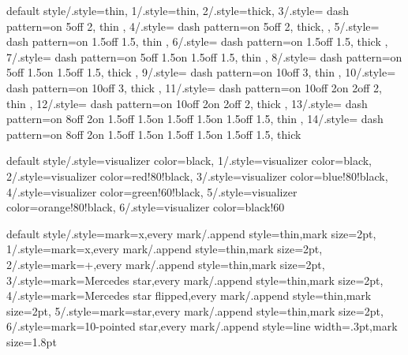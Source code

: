 {
  default style/.style=thin,
  1/.style=thin,
  2/.style=thick,
  3/.style={
    dash pattern=on 5\pgflinewidth off 2\pgflinewidth,
    thin
  },
  4/.style={
    dash pattern=on 5\pgflinewidth off 2\pgflinewidth,
    thick,
  },
  5/.style={
    dash pattern=on 1.5\pgflinewidth off 1.5\pgflinewidth,
    thin
  },
  6/.style={
    dash pattern=on 1.5\pgflinewidth off 1.5\pgflinewidth,
    thick
  },
  7/.style={
    dash pattern=on 5\pgflinewidth off 1.5\pgflinewidth on
    1.5\pgflinewidth off 1.5\pgflinewidth,
    thin
  },
  8/.style={
    dash pattern=on 5\pgflinewidth off 1.5\pgflinewidth on
    1.5\pgflinewidth off 1.5\pgflinewidth,
    thick
  },
  9/.style={
    dash pattern=on 10\pgflinewidth off 3\pgflinewidth,
    thin
  },
  10/.style={
    dash pattern=on 10\pgflinewidth off 3\pgflinewidth,
    thick
  },
  11/.style={
    dash pattern=on 10\pgflinewidth off 2\pgflinewidth on
    2\pgflinewidth off 2\pgflinewidth,
    thin
  },
  12/.style={
    dash pattern=on 10\pgflinewidth off 2\pgflinewidth on
    2\pgflinewidth off 2\pgflinewidth,
    thick
  },
  13/.style={
    dash pattern=on 8\pgflinewidth off 2\pgflinewidth on
    1.5\pgflinewidth off 1.5\pgflinewidth on 1.5\pgflinewidth off
    1.5\pgflinewidth on 1.5\pgflinewidth off 1.5\pgflinewidth,
    thin
  },
  14/.style={
    dash pattern=on 8\pgflinewidth off 2\pgflinewidth on
    1.5\pgflinewidth off 1.5\pgflinewidth on 1.5\pgflinewidth off
    1.5\pgflinewidth on 1.5\pgflinewidth off 1.5\pgflinewidth,
    thick
  }  
}


{
  default style/.style={visualizer color=black},
  1/.style={visualizer color=black},
  2/.style={visualizer color=red!80!black},
  3/.style={visualizer color=blue!80!black},
  4/.style={visualizer color=green!60!black},
  5/.style={visualizer color=orange!80!black},
  6/.style={visualizer color=black!60}
}


{
  default style/.style={mark=x,every mark/.append style=thin,mark size=2pt},
  1/.style={mark=x,every mark/.append style=thin,mark size=2pt},
  2/.style={mark=+,every mark/.append style=thin,mark size=2pt},
  3/.style={mark=Mercedes star,every mark/.append style=thin,mark size=2pt},
  4/.style={mark=Mercedes star flipped,every mark/.append style=thin,mark size=2pt},
  5/.style={mark=star,every mark/.append style=thin,mark size=2pt},
  6/.style={mark=10-pointed star,every mark/.append style={line width=.3pt,mark size=1.8pt}}
}


